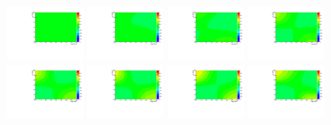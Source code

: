 \begin{figure}[h]
  \centering
\includegraphics[width=0.2\textwidth]{figures/sec-background/correlation/res_th2F_res_th2f_res_alpha_00_n200.pdf}
\includegraphics[width=0.2\textwidth]{figures/sec-background/correlation/res_th2F_res_th2f_res_alpha_01_n200.pdf}
\includegraphics[width=0.2\textwidth]{figures/sec-background/correlation/res_th2F_res_th2f_res_alpha_02_n200.pdf}
\includegraphics[width=0.2\textwidth]{figures/sec-background/correlation/res_th2F_res_th2f_res_alpha_03_n200.pdf}
\includegraphics[width=0.2\textwidth]{figures/sec-background/correlation/res_th2F_res_th2f_res_alpha_04_n200.pdf}
\includegraphics[width=0.2\textwidth]{figures/sec-background/correlation/res_th2F_res_th2f_res_alpha_05_n200.pdf}
\includegraphics[width=0.2\textwidth]{figures/sec-background/correlation/res_th2F_res_th2f_res_alpha_06_n200.pdf}
\includegraphics[width=0.2\textwidth]{figures/sec-background/correlation/res_th2F_res_th2f_res_alpha_07_n200.pdf}

\end{figure}
